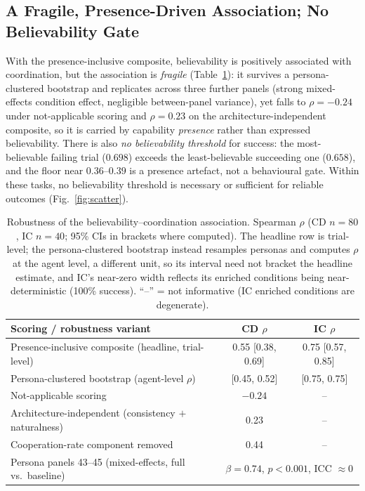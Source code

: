 \documentclass[runningheads]{llncs}
\begin{document}
\subsection{A Fragile, Presence-Driven Association; No Believability Gate}\label{sec:results-assoc}
With the presence-inclusive composite, believability is positively associated with coordination, but the association is \emph{fragile} (Table~\ref{tab:assoc}): it survives a persona-clustered bootstrap and replicates across three further panels (strong mixed-effects condition effect, negligible between-panel variance), yet falls to $\rho=-0.24$ under not-applicable scoring and $\rho=0.23$ on the architecture-independent composite, so it is carried by capability \emph{presence} rather than expressed believability. There is also \emph{no believability threshold} for success: the most-believable failing trial ($0.698$) exceeds the least-believable succeeding one ($0.658$), and the floor near $0.36$--$0.39$ is a presence artefact, not a behavioural gate. Within these tasks, no believability threshold is necessary or sufficient for reliable outcomes (Fig.~\ref{fig:scatter}).
\begin{table}[t]
\centering
\caption{Robustness of the believability--coordination association. Spearman $\rho$ (CD $n=80$, IC $n=40$; 95\% CIs in brackets where computed). The headline row is trial-level; the persona-clustered bootstrap instead resamples personas and computes $\rho$ at the agent level, a different unit, so its interval need not bracket the headline estimate, and IC's near-zero width reflects its enriched conditions being near-deterministic (100\% success). ``--'' = not informative (IC enriched conditions are degenerate).}
\label{tab:assoc}
\small
\setlength{\tabcolsep}{5pt}
\begin{tabular}{l cc}
\toprule
Scoring / robustness variant & CD $\rho$ & IC $\rho$ \\
\midrule
Presence-inclusive composite (headline, trial-level) & 0.55 [0.38, 0.69] & 0.75 [0.57, 0.85] \\
Persona-clustered bootstrap (agent-level $\rho$) & [0.45, 0.52] & [0.75, 0.75] \\
Not-applicable scoring & $-0.24$ & -- \\
Architecture-independent (consistency $+$ naturalness) & 0.23 & -- \\
Cooperation-rate component removed & 0.44 & -- \\
\midrule
Persona panels 43--45 (mixed-effects, full vs.\ baseline) & \multicolumn{2}{c}{$\beta=0.74$, $p<0.001$, ICC $\approx 0$} \\
\bottomrule
\end{tabular}
\end{table}
\end{document}
